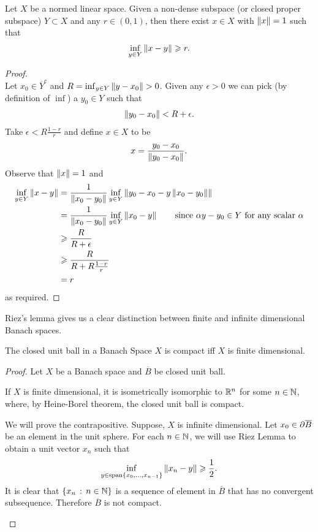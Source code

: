 \documentclass[12pt]{article}
\begin{document}
\begin{flemma}
    Let $X$ be a normed linear space. Given a non-dense subspace (or closed proper subspace) $Y \subset X$ and any $r \in (0, 1)$, then there exist $x \in X$ with $\norm[x] = 1$ such that 
    \begin{align*}
    \inf_{y \in Y} \norm[x - y] \geq r. 
    \end{align*}
\end{flemma}
\begin{proof}\hfill \\
    Let $x_0 \in \overline{Y}^c$ and $R = \inf_{y \in Y}\norm[y - x_0] > 0$. Given any $\epsilon > 0$ we can pick (by definition of $\inf$) a $y_0 \in Y$ such that 
    \begin{align*}
    \norm[y_0 - x_0] < R + \epsilon. 
    \end{align*}
    Take $\epsilon < R \frac{1 - r}{r}$ and define $x \in X$ to be
    \begin{align*}
    x = \frac{y_0 - x_0}{\norm[y_0 - x_0]}. 
    \end{align*}
    Observe that $\norm[x] = 1$ and 
    \begin{align*}
    \inf_{y \in Y} \norm[x - y] 
    &= \frac{1}{\norm[x_0 - y_0]} \inf_{y \in Y} \norm[y_0 - x_0 - y \norm[x_0 - y_0] ] \\
    &= \frac{1}{\norm[x_0 - y_0]} \inf_{y \in Y} \norm[x_0 - y] \tag*{since $\alpha y - y_0 \in Y$ for any scalar $\alpha$} \\
    &\geq \frac{R}{R + \epsilon} \\
    &\geq \frac{R}{R + R \frac{1 - r}{r}} \\
    &= r
    \end{align*}
    as required. 
\end{proof}



Riez's lemma gives us a clear distinction between finite and infinite dimensional Banach spaces. 
\begin{cor}
    The closed unit ball in a Banach Space $X$ is compact iff $X$ is finite dimensional. 
\end{cor}
\begin{proof}
    Let $X$ be a Banach space and $\overline{B}$ be closed unit ball. 
    \begin{case}[ $\Longleftarrow$ ] If $X$ is finite dimensional, it is isometrically isomorphic to $\R^n$ for some $n \in \N$, where, by Heine-Borel theorem, the closed unit ball is compact. 
    \end{case}
    
    
    \begin{case}[$\implies$] We will prove the contrapositive. Suppose, $X$ is infinite dimensional. Let $x_0 \in \p \overline{B}$ be an element in the unit sphere. For each $n \in \N$, we will use Riez Lemma to obtain a unit vector $x_n$ such that 
        $$\inf_{y \in \mathrm{span}\set{x_0, \dots, x_{n - 1}}} \norm[x_n - y] \geq \frac{1}{2}. $$
        It is clear that $\set{x_n \wh n \in \N}$ is a sequence of element in $\overline{B}$ that has no convergent subsequence. Therefore $\overline{B}$ is not compact. 
    \end{case}
\end{proof}
\end{document}
